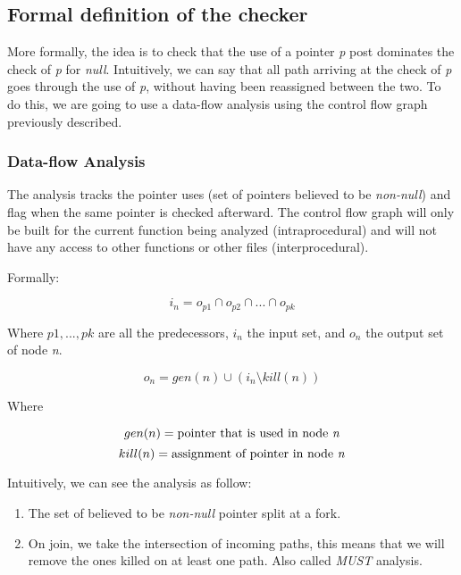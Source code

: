\subsection{Formal definition of the checker}
\label{subsec:checker_formal_definition}
More formally, the idea is to check that the use of a pointer \emph{p} post dominates the check of \emph{p} for \emph{null}.
Intuitively, we can say that all path arriving at the check of \emph{p} goes through the use of \emph{p}, without having been reassigned between the two. 
To do this, we are going to use a data-flow analysis using the control flow graph previously described.

\subsubsection{Data-flow Analysis}
\label{subsubsec:data_flow_analysis}

The analysis tracks the pointer uses (set of pointers believed to be \emph{non-null}) and flag when the same pointer is checked afterward.
The control flow graph will only be built for the current function being analyzed (intraprocedural) and will not have any access to other functions or other files (interprocedural).

Formally:

\begin{equation}\label{eqn:dataflow1}
i_{n} = o_{p1}  \cap   o_{p2}  \cap  ... \cap   o_{pk}
\end{equation}

Where $p1, ..., pk$ are all the predecessors, $i_{n}$ the input set, and  $o_{n}$ the output set of node \emph{n}.

\begin{equation}\label{eqn:dataflow2}
o_{n} = gen(n)  \cup   (i_{n} \setminus kill(n))
\end{equation}

Where

\begin{equation}\label{eqn:dataflow3}
gen(n) =\text{pointer that is used in node \emph{n}}
\end{equation}
\begin{equation}\label{eqn:dataflow4}
kill(n) = \text{assignment of pointer in node \emph{n}}
\end{equation}

Intuitively, we can see the analysis as follow:
\begin{enumerate}
	\item The set of believed to be \emph{non-null} pointer split at a fork. \newline 
	\item On join, we take the intersection of incoming paths, this means that we will remove the ones killed on at least one path. Also called \emph{MUST} analysis. \newline 
\end{enumerate}

